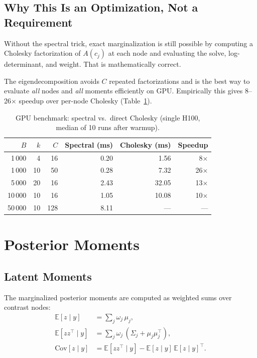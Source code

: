 \documentclass[11pt]{article}
\newcommand{\E}{\mathbb{E}}
\newcommand{\Cov}{\mathrm{Cov}}
\begin{document}
\subsection{Why This Is an Optimization, Not a Requirement}

Without the spectral trick, exact marginalization is still possible by
computing a Cholesky factorization of $A(c_j)$ at each node and
evaluating the solve, log-determinant, and weight.  That is
mathematically correct.

The eigendecomposition avoids $C$ repeated factorizations and is the
best way to evaluate \emph{all} nodes and \emph{all} moments
efficiently on GPU.  Empirically this gives 8--26$\times$ speedup
over per-node Cholesky (Table~\ref{tab:benchmark}).

\begin{table}[h]
\centering
\caption{GPU benchmark: spectral vs.\ direct Cholesky
         (single H100, median of 10 runs after warmup).}
\label{tab:benchmark}
\begin{tabular}{rrr rr r}
\toprule
$B$ & $k$ & $C$ & Spectral (ms) & Cholesky (ms) & Speedup \\
\midrule
1\,000 & 4  & 16  & 0.20 & 1.56  &  8$\times$ \\
1\,000 & 10 & 50  & 0.28 & 7.32  & 26$\times$ \\
5\,000 & 20 & 16  & 2.43 & 32.05 & 13$\times$ \\
10\,000& 10 & 16  & 1.05 & 10.08 & 10$\times$ \\
50\,000& 10 & 128 & 8.11 & ---   & --- \\
\bottomrule
\end{tabular}
\end{table}

\section{Posterior Moments}
\label{sec:moments}

\subsection{Latent Moments}

The marginalized posterior moments are computed as weighted sums over
contrast nodes:
\begin{align}
  \E[z \mid y] &= \sum_j \omega_j\, \mu_j, \label{eq:Ez} \\
  \E[zz^\top \mid y] &= \sum_j \omega_j\, (\Sigma_j + \mu_j \mu_j^\top),
  \label{eq:Ezz} \\
  \Cov[z \mid y] &= \E[zz^\top \mid y] - \E[z \mid y]\,\E[z \mid y]^\top.
  \label{eq:Covz}
\end{align}
\end{document}
